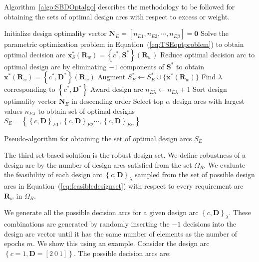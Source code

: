 Algorithm~\ref{algo:SBDOptalgo} describes the methodology to be followed for obtaining the sets of optimal design arcs with respect to excess or weight.

\begin{algorithm}
	\DontPrintSemicolon %
	Initialize design optimality vector $\mathbf{N}_E = \left[n_{E1},n_{E2},\cdots,n_{E\beta}\right] = \mathbf{0}$\;	
	 {
		Solve the parametric optimization problem in Equation~(\ref{eq:TSEoptproblem}) to obtain optimal decision arc $\mathbf{x}_S^*(\mathbf{R}_w) = \left\{c^*,\mathbf{S}^*\right\}(\mathbf{R}_w)$\;
		Reduce optimal decision arc to optimal design arc by eliminating $-1$ components of $\mathbf{S}^*$ to obtain $\mathbf{x}^*(\mathbf{R}_w) = \left\{c^*,\mathbf{D}^*\right\}(\mathbf{R}_w)$\;
		Augment $S_{E}^* \gets S_{E}^* \cup \{ \mathbf{x}^*(\mathbf{R}_w) \} $\;
		Find $\lambda$ corresponding to $\left\{c^*,\mathbf{D}^*\right\}$\;
		Award design arc $n_{E\lambda} \gets n_{E\lambda} + 1$\;
	}
	Sort design optimality vector $\mathbf{N}_E$ in descending order\;
	Select top $\alpha$ design arcs with largest values $n_{E\lambda}$ to obtain set of optimal designs $S_E = \left\{\left\{c,\mathbf{D}\right\}_{E1},\left\{c,\mathbf{D}\right\}_{E2}\cdots,\left\{c,\mathbf{D}\right\}_{E\alpha}\right\}$\;
	\caption{Pseudo-algorithm for obtaining the set of optimal design arcs $S_{E}$}
	\label{algo:SBDOptalgo}
\end{algorithm}

The third set-based solution is the robust design set. We define robustness of a design arc by the number of design arcs satisfied from the set $\Omega_R$. We evaluate the feasibility of each design arc $\left\{c,\mathbf{D}\right\}_\lambda$ sampled from the set of possible design arcs in Equation~(\ref{eq:feasibledesignset}) with respect to every requirement arc $\mathbf{R}_w$ in $\Omega_R$.

We generate all the possible decision arcs for a given design arc $\left\{c,\mathbf{D}\right\}_\lambda$. These combinations are generated by randomly inserting the $-1$ decisions into the design arc vector until it has the same number of elements as the number of epochs $m$. We show this using an example. Consider the design arc $\left\{c = 1,\mathbf{D} = \left[2 ~ 0 ~ 1\right]\right\}$. The possible decision arcs are:

